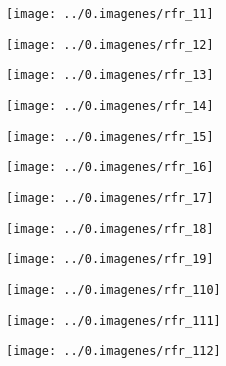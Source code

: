 \begin{rightcolumn}

 \begin{figure}
\centering
\texttt{[image: ../0.imagenes/rfr\_11]}
\end{figure}

 \begin{figure}
\centering
\texttt{[image: ../0.imagenes/rfr\_12]}
\end{figure}

 \begin{figure}
\centering
\texttt{[image: ../0.imagenes/rfr\_13]}
\end{figure}

 \begin{figure}
\centering
\texttt{[image: ../0.imagenes/rfr\_14]}
\end{figure}

 \begin{figure}
\centering
\texttt{[image: ../0.imagenes/rfr\_15]}
\end{figure}

 \begin{figure}
\centering
\texttt{[image: ../0.imagenes/rfr\_16]}
\end{figure}

 \begin{figure}
\centering
\texttt{[image: ../0.imagenes/rfr\_17]}
\end{figure}

 \begin{figure}
\centering
\texttt{[image: ../0.imagenes/rfr\_18]}
\end{figure}

 \begin{figure}
\centering
\texttt{[image: ../0.imagenes/rfr\_19]}
\end{figure}

 \begin{figure}
\centering
\texttt{[image: ../0.imagenes/rfr\_110]}
\end{figure}

 \begin{figure}
\centering
\texttt{[image: ../0.imagenes/rfr\_111]}
\end{figure}

 \begin{figure}
\centering
\texttt{[image: ../0.imagenes/rfr\_112]}
\end{figure}


\end{rightcolumn}
